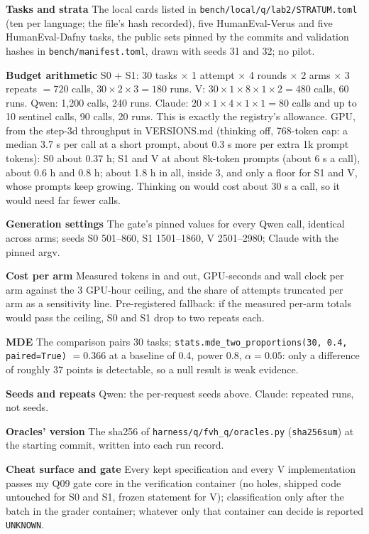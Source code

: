 \documentclass[11pt]{article}
\begin{document}
\begin{answer}
\textbf{Tasks and strata} The local cards listed in
\texttt{bench/local/q/lab2/STRATUM.toml} (ten per language; the file's hash
recorded), five HumanEval-Verus and five HumanEval-Dafny tasks, the public
sets pinned by the commits and validation hashes in
\texttt{bench/manifest.toml}, drawn with seeds 31 and 32; no pilot.

\textbf{Budget arithmetic} S0 + S1: 30 tasks $\times$ 1 attempt $\times$ 4
rounds $\times$ 2 arms $\times$ 3 repeats $= 720$ calls, $30 \times 2 \times 3
= 180$ runs. V: $30 \times 1 \times 8 \times 1 \times 2 = 480$ calls, 60 runs.
Qwen: 1,200 calls, 240 runs. Claude: $20 \times 1 \times 4 \times 1 \times 1 =
80$ calls and up to 10 sentinel calls, 90 calls, 20 runs. This is exactly the
registry's allowance. GPU, from the step-3d throughput in VERSIONS.md (thinking
off, 768-token cap: a median 3.7 s per call at a short prompt, about 0.3 s more
per extra 1k prompt tokens): S0 about 0.37 h; S1 and V at about 8k-token
prompts (about 6 s a call), about 0.6 h and 0.8 h; about 1.8 h in all, inside
3, and only a floor for S1 and V, whose prompts keep growing. Thinking on
would cost about 30 s a call, so it would need far fewer calls.

\textbf{Generation settings} The gate's pinned values for every Qwen call,
identical across arms; seeds S0 501--860, S1 1501--1860, V 2501--2980; Claude
with the pinned argv.

\textbf{Cost per arm} Measured tokens in and out, GPU-seconds and wall clock
per arm against the 3 GPU-hour ceiling, and the share of attempts truncated
per arm as a sensitivity line. Pre-registered fallback: if the measured
per-arm totals would pass the ceiling, S0 and S1 drop to two repeats each.

\textbf{MDE} The comparison pairs 30 tasks;
\texttt{stats.mde\_two\_proportions(30, 0.4, paired=True)} $= 0.366$ at a
baseline of 0.4, power 0.8, $\alpha = 0.05$: only a difference of roughly 37
points is detectable, so a null result is weak evidence.

\textbf{Seeds and repeats} Qwen: the per-request seeds above. Claude:
repeated runs, not seeds.

\textbf{Oracles' version} The sha256 of \texttt{harness/q/fvh\_q/oracles.py}
(\texttt{sha256sum}) at the starting commit, written into each run record.

\textbf{Cheat surface and gate} Every kept specification and every V
implementation passes my Q09 gate core in the verification container (no
holes, shipped code untouched for S0 and S1, frozen statement for V);
classification only after the batch in the grader container; whatever only
that container can decide is reported \texttt{UNKNOWN}.


\end{answer}
\end{document}
